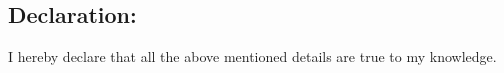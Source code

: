 \documentclass[margin,line]{res}
\begin{document}
\begin{resume}
{\section{\Large \bf{Declaration:}}} 

 I hereby declare that all the above mentioned details are true to my knowledge.
\hfill




\end{resume}
\end{document}
